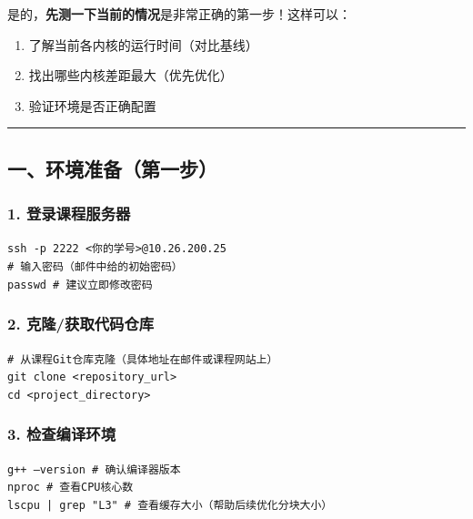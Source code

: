 \documentclass[11pt, a4paper]{article}
\begin{document}
\begin{aibox}
是的，\textbf{先测一下当前的情况}是非常正确的第一步！这样可以：
\begin{enumerate}
    \item 了解当前各内核的运行时间（对比基线）
    \item 找出哪些内核差距最大（优先优化）
    \item 验证环境是否正确配置
\end{enumerate}

\begin{center}\rule{\textwidth}{0.4pt}\end{center}

\subsection*{一、环境准备（第一步）}

\subsubsection*{1. 登录课程服务器}
\begin{tcolorbox}[colback=white,colframe=gray!50!white,boxrule=0.5pt,arc=2pt,left=5pt,right=5pt,top=5pt,bottom=5pt]
\texttt{ssh -p 2222 \textless 你的学号\textgreater @10.26.200.25}\\
\texttt{\# 输入密码（邮件中给的初始密码）}\\
\texttt{passwd  \# 建议立即修改密码}
\end{tcolorbox}

\subsubsection*{2. 克隆/获取代码仓库}
\begin{tcolorbox}[colback=white,colframe=gray!50!white,boxrule=0.5pt,arc=2pt,left=5pt,right=5pt,top=5pt,bottom=5pt]
\texttt{\# 从课程Git仓库克隆（具体地址在邮件或课程网站上）}\\
\texttt{git clone \textless repository\_url\textgreater }\\
\texttt{cd \textless project\_directory\textgreater }
\end{tcolorbox}

\subsubsection*{3. 检查编译环境}
\begin{tcolorbox}[colback=white,colframe=gray!50!white,boxrule=0.5pt,arc=2pt,left=5pt,right=5pt,top=5pt,bottom=5pt]
\texttt{g++ --version      \# 确认编译器版本}\\
\texttt{nproc              \# 查看CPU核心数}\\
\texttt{lscpu | grep "L3"  \# 查看缓存大小（帮助后续优化分块大小）}
\end{tcolorbox}


\end{aibox}
\end{document}
